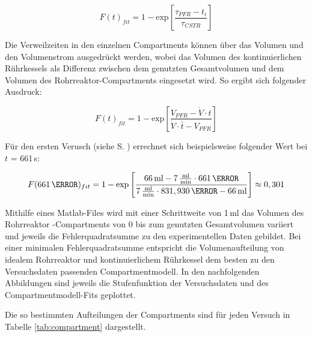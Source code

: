 \documentclass[12pt,liststotoc]{report}
\begin{document}
\begin{equation}
F(t)_{fit} = 1 - \text{exp}\left[\frac{\tau_{PFR} - t_i}{\tau_{CSTR}}\right]
\end{equation}

\par Die Verweilzeiten in den einzelnen Compartments können über das Volumen und den Volumenstrom ausgedrückt werden, wobei das Volumen des kontinuierlichen Rührkessels als Differenz zwischen dem genutzten Gesamtvolumen und dem Volumen des Rohrreaktor-Compartments eingesetzt wird. So ergibt sich folgender Ausdruck:

\begin{equation}
F(t)_{fit} = 1 - \text{exp}\left[\frac{V_{PFR} - \dot{V} \cdot t}{\dot{V} \cdot {\bar{t}} - {V}_{PFR}}\right]
\end{equation}

Für den ersten Verusch (siehe S. \pageref{tab:Versuchsnummerierung}) errechnet sich beispielsweise folgender Wert bei $t$ = 661\,s:

\begin{equation}
F(661\,\s)_{fit} = 1 - \text{exp}\left[\frac{66\,\text{ml} - 7\,\frac{\text{ml}}{\text{min}}\cdot661\,\s }{7\,\frac{\text{ml}}{\text{min}}\cdot831,930\,\s - 66\,\text{ml}}\right] \approx 0,301
\end{equation}

\par Mithilfe eines Matlab-Files wird mit einer Schrittweite von 1\,ml das Volumen des Rohrreaktor -Compartments von 0 bis zum genutzten Gesamtvolumen variiert und jeweils die Fehlerquadratsumme zu den experimentellen Daten gebildet. Bei einer minimalen Fehlerquadratsumme entspricht die Volumenaufteilung von idealem Rohrreaktor und kontinuierlichem Rührkessel dem besten zu den Versuchsdaten passenden Compartmentmodell. In den nachfolgenden Abbildungen sind jeweils die Stufenfunktion der Versuchsdaten und des Compartmentmodell-Fits geplottet.

\par Die so bestimmten Aufteilungen der Compartments sind für jeden Versuch in Tabelle \ref{tab:compartment} dargestellt.
\end{document}
